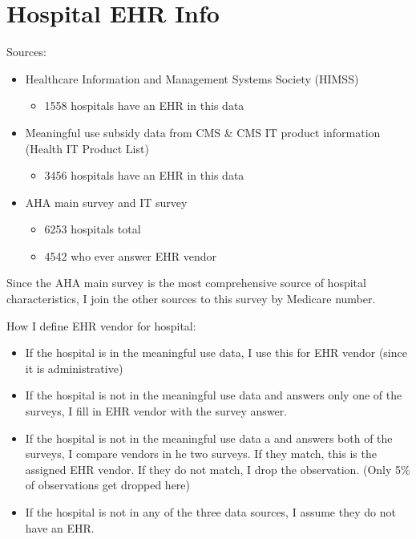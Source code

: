 \documentclass[12pt]{article}
\begin{document}
\singlespacing

\section{Hospital EHR Info}
Sources:
\begin{itemize}
    \item Healthcare Information and Management Systems Society (HIMSS)
    \begin{itemize}
        \item 1558 hospitals have an EHR in this data
    \end{itemize}
    \item Meaningful use subsidy data from CMS \& CMS IT product information (Health IT Product List)
    \begin{itemize}
        \item 3456 hospitals have an EHR in this data
    \end{itemize}
    \item AHA main survey and IT survey
    \begin{itemize}
        \item 6253 hospitals total
        \item 4542 who ever answer EHR vendor
    \end{itemize}
\end{itemize}

\noindent Since the AHA main survey is the most comprehensive source of hospital characteristics, I join the other sources to this survey by Medicare number. 

\noindent How I define EHR vendor for hospital:
\begin{itemize}
    \item If the hospital is in the meaningful use data, I use this for EHR vendor (since it is administrative)
    \item If the hospital is not in the meaningful use data and answers only one of the surveys, I fill in EHR vendor with the survey answer.
    \item If the hospital is not in the meaningful use data a and answers both of the surveys, I compare vendors in he two surveys. If they match, this is the assigned EHR vendor. If they do not match, I drop the observation. (Only 5\% of observations get dropped here)
    \item If the hospital is not in any of the three data sources, I assume they do not have an EHR. 
\end{itemize}
\end{document}
